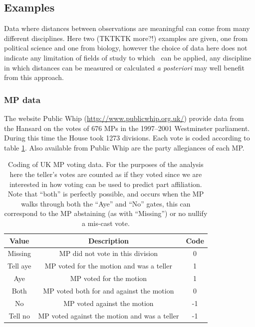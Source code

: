 \subsection{Examples}

Data where distances between observations are meaningful can come from many different disciplines. Here two (TKTKTK more?!) examples are given, one from political science and one from biology, however the choice of data here does not indicate any limitation of fields of study to which \mdsds\ can be applied, any discipline in which distances can be measured or calculated \textit{a posteriori} may well benefit from this approach.


\subsubsection{MP data}


The website Public Whip (\url{http://www.publicwhip.org.uk/}) provide data from the Hansard on the votes of 676 MPs in the 1997--2001 Westminster parliament. During this time the House took 1273 divisions. Each vote is coded according to table \ref{voting-code}. Also available from Public Whip are the party allegiances of each MP. 

\begin{table}  
\begin{centering}
\begin{tabular}{ccc}
    Value & Description & Code \\ 
    \hline
    \hline
    Missing & MP did not vote in this division & 0 \\ 
    Tell aye & MP voted for the motion and was a teller & 1 \\ 
    Aye & MP voted for the motion & 1 \\ 
    Both & MP voted both for  and against the motion & 0 \\ 
    No & MP voted against the motion & -1 \\ 
    Tell no & MP voted against the motion and was a teller & -1 \\ 
  \end{tabular}
\caption{Coding of UK MP voting data. For the purposes of the analysis here the teller's votes are counted as if they voted since we are interested in how voting can be used to predict part affiliation. Note that ``both'' is perfectly possible, and occurs when the MP walks through both the ``Aye'' and ``No'' gates, this can correspond to the MP abstaining (as with ``Missing'') or no nullify a mis-cast vote.}
\end{centering}
\label{voting-code}
\end{table}

